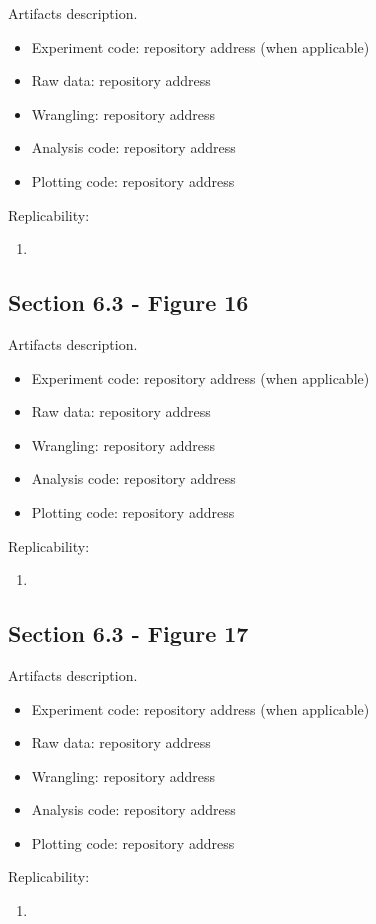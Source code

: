 Artifacts description.

\begin{itemize}
    \item Experiment code: repository address (when applicable)
    \item Raw data: repository address
    \item Wrangling: repository address
    \item Analysis code: repository address
    \item Plotting code: repository address
\end{itemize}

Replicability:

\begin{enumerate}
    \item
\end{enumerate}


\subsection{Section 6.3 - Figure 16}
\label{apndx:fig16}

Artifacts description.

\begin{itemize}
    \item Experiment code: repository address (when applicable)
    \item Raw data: repository address
    \item Wrangling: repository address
    \item Analysis code: repository address
    \item Plotting code: repository address
\end{itemize}

Replicability:

\begin{enumerate}
    \item
\end{enumerate}


\subsection{Section 6.3 - Figure 17}
\label{apndx:fig17}

Artifacts description.

\begin{itemize}
    \item Experiment code: repository address (when applicable)
    \item Raw data: repository address
    \item Wrangling: repository address
    \item Analysis code: repository address
    \item Plotting code: repository address
\end{itemize}

Replicability:

\begin{enumerate}
    \item
\end{enumerate}

